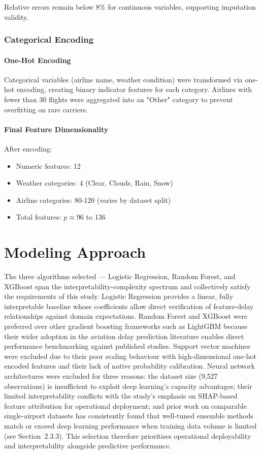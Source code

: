 \documentclass{report}
\begin{document}
Relative errors remain below 8\% for continuous variables, supporting imputation validity.

\subsubsection{Categorical Encoding}

\paragraph{One-Hot Encoding}

Categorical variables (airline name, weather condition) were transformed via one-hot encoding, creating binary indicator features for each category. Airlines with fewer than 30 flights were aggregated into an "Other" category to prevent overfitting on rare carriers.

\paragraph{Final Feature Dimensionality}

After encoding:
\begin{itemize}
    \item Numeric features: 12
    \item Weather categories: 4 (Clear, Clouds, Rain, Snow)
    \item Airline categories: 80-120 (varies by dataset split)
    \item Total features: $p \approx 96$ to 136
\end{itemize}

\section{Modeling Approach}
\label{sec:models}

The three algorithms selected --- Logistic Regression, Random Forest, and XGBoost span the interpretability-complexity spectrum and collectively satisfy the 
requirements of this study. Logistic Regression provides a linear, fully 
interpretable baseline whose coefficients allow direct verification of feature-delay 
relationships against domain expectations. Random Forest and XGBoost were preferred 
over other gradient boosting frameworks such as LightGBM because their wider 
adoption in the aviation delay prediction literature enables direct performance 
benchmarking against published studies. Support vector machines were excluded due to 
their poor scaling behaviour with high-dimensional one-hot encoded features and their 
lack of native probability calibration. Neural network architectures were excluded 
for three reasons: the dataset size (9,527 observations) is insufficient to exploit 
deep learning's capacity advantages; their limited interpretability conflicts with 
the study's emphasis on SHAP-based feature attribution for operational deployment; 
and prior work on comparable single-airport datasets has consistently found that 
well-tuned ensemble methods match or exceed deep learning performance when training 
data volume is limited (see Section~2.3.3). This selection therefore prioritises 
operational deployability and interpretability alongside predictive performance.
\end{document}
